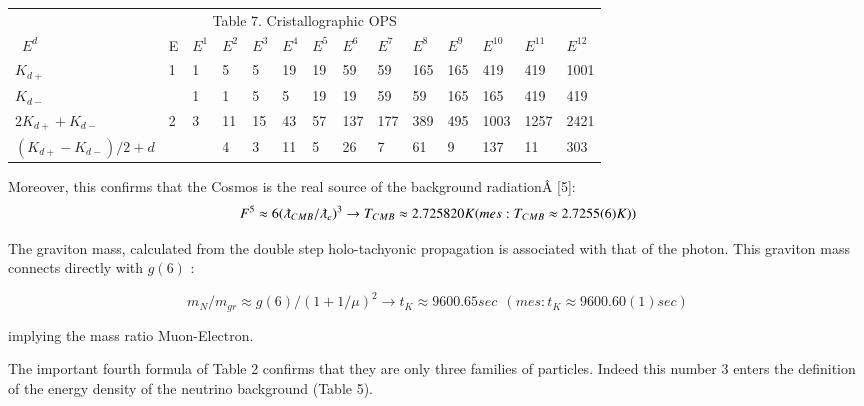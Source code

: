 \documentclass[a4paper,9pt]{article}
\begin{document}
\begin{table*}
  \hskip 1.0cm\begin{tabular}{llllllllllllll}
    \toprule
    \multicolumn{14}{c}{Table 7. Cristallographic OPS}                  \\
    \cmidrule(r){1-14}
    \ $E^d$ & E & $E^1$  & $E^2$ & $E^3$ & $E^4$ & $E^5$ & $E^6$ & $E^7$ & $E^8$ & $E^9$ & $E^{10}$ & $E^{11}$ & $E^{12}$ \\
    \midrule
    $K_{d+}$  & 1 & 1 & 5 & 5 & 19 & 19 & 59 & 59 & 165 & 165 & 419 & 419 & 1001 \\
    
     $K_{d-}$  &  & 1 & 1 & 5 & 5 & 19 & 19 & 59 & 59 & 165 & 165& 419 & 419 \\
     
     $2K_{d+} + K_{d-}$  & 2 & 3 & 11 & 15 & 43 & 57 & 137 & 177 & 389 & 495 & 1003 & 1257& 2421 \\
     
      $(K_{d+} - K_{d-})/2 + d$  &  &  & 4 & 3 & 11 & 5 & 26 & 7 & 61 & 9 & 137 & 11& 303 \\

    \bottomrule
  \end{tabular}
  \label{tab:table}
\end{table*}


Moreover, this confirms that the Cosmos is the real source of the background radiationÂ [5]:
\begin{equation}

 F^5  \approx 6(\lambdabar_{CMB}/\lambdabar_{e})^3 \rightarrow  T_{CMB}  \approx  2.725820 K  (mes : T_{CMB}  \approx  2.7255(6) K)) 
 
\end{equation}


The graviton mass, calculated from the double step holo-tachyonic propagation is associated with that of the photon. This graviton mass connects directly with $g(6)$ :

\begin{equation}
m_N/m_{gr} \approx g(6)/(1+1/\mu)^2 \rightarrow    t_K  \approx  9600.65 sec ~~(mes : t_K \approx 9600.60(1) sec)    
\end{equation}

implying the mass ratio Muon-Electron. 

The important fourth formula of Table 2 confirms that they are only three families of particles. Indeed this number 3 enters the definition of the energy density of the neutrino background (Table 5). 
\end{document}
